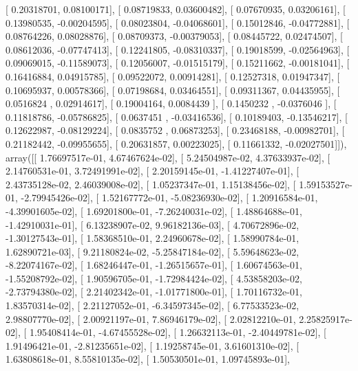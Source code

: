\documentclass{article}
\begin{document}
       [ 0.20318701,  0.08100171],
       [ 0.08719833,  0.03600482],
       [ 0.07670935,  0.03206161],
       [ 0.13980535, -0.00204595],
       [ 0.08023804, -0.04068601],
       [ 0.15012846, -0.04772881],
       [ 0.08764226,  0.08028876],
       [ 0.08709373, -0.00379053],
       [ 0.08445722,  0.02474507],
       [ 0.08612036, -0.07747413],
       [ 0.12241805, -0.08310337],
       [ 0.19018599, -0.02564963],
       [ 0.09069015, -0.11589073],
       [ 0.12056007, -0.01515179],
       [ 0.15211662, -0.00181041],
       [ 0.16416884,  0.04915785],
       [ 0.09522072,  0.00914281],
       [ 0.12527318,  0.01947347],
       [ 0.10695937,  0.00578366],
       [ 0.07198684,  0.03464551],
       [ 0.09311367,  0.04435955],
       [ 0.0516824 ,  0.02914617],
       [ 0.19004164,  0.0084439 ],
       [ 0.1450232 , -0.0376046 ],
       [ 0.11818786, -0.05786825],
       [ 0.0637451 , -0.03416536],
       [ 0.10189403, -0.13546217],
       [ 0.12622987, -0.08129224],
       [ 0.0835752 ,  0.06873253],
       [ 0.23468188, -0.00982701],
       [ 0.21182442, -0.09955655],
       [ 0.20631857,  0.00223025],
       [ 0.11661332, -0.02027501]]), array([[  1.76697517e-01,   4.67467624e-02],
       [  5.24504987e-02,   4.37633937e-02],
       [  2.14760531e-01,   3.72491991e-02],
       [  2.20159145e-01,  -1.41227407e-01],
       [  2.43735128e-02,   2.46039008e-02],
       [  1.05237347e-01,   1.15138456e-02],
       [  1.59153527e-01,  -2.79945426e-02],
       [  1.52167772e-01,  -5.08236930e-02],
       [  1.20916584e-01,  -4.39901605e-02],
       [  1.69201800e-01,  -7.26240031e-02],
       [  1.48864688e-01,  -1.42910031e-01],
       [  6.13238907e-02,   9.96182136e-03],
       [  4.70672896e-02,  -1.30127543e-01],
       [  1.58368510e-01,   2.24960678e-02],
       [  1.58990784e-01,   1.62890721e-03],
       [  9.21180824e-02,  -5.25847184e-02],
       [  5.59648623e-02,  -8.22074167e-02],
       [  1.68246447e-01,  -1.26515657e-01],
       [  1.60674563e-01,  -1.55208792e-02],
       [  1.90596705e-01,  -1.72984424e-02],
       [  4.53858203e-02,  -2.73794380e-02],
       [  2.21402342e-01,  -1.01771800e-01],
       [  1.70116732e-01,   1.83570314e-02],
       [  2.21127052e-01,  -6.34597345e-02],
       [  6.77533523e-02,   2.98807770e-02],
       [  2.00921197e-01,   7.86946179e-02],
       [  2.02812210e-01,   2.25825917e-02],
       [  1.95408414e-01,  -4.67455528e-02],
       [  1.26632113e-01,  -2.40449781e-02],
       [  1.91496421e-01,  -2.81235651e-02],
       [  1.19258745e-01,   3.61601310e-02],
       [  1.63808618e-01,   8.55810135e-02],
       [  1.50530501e-01,   1.09745893e-01],
\end{document}
